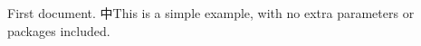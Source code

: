 \documentclass{ctexart}
\begin{document}
First document. 中This is a simple example, with no 
extra parameters or packages included.
\end{document}
